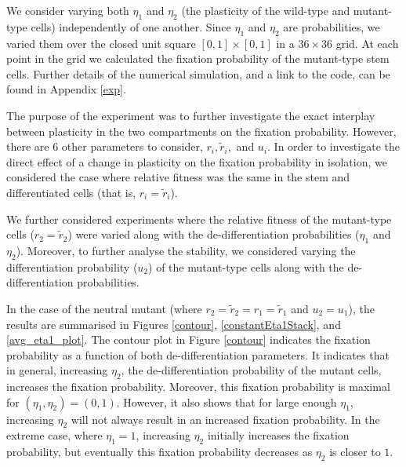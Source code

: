 \documentclass[12pt]{article}
\begin{document}
We consider varying both $\eta_1$ and $\eta_2$ (the plasticity of the wild-type and mutant-type cells) independently of one another. Since $\eta_1$ and $\eta_2$ are probabilities, we varied them over the closed unit square $[0,1]\times[0,1]$ in a $36\times36$ grid. At each point in the grid we calculated the fixation probability of the mutant-type stem cells. Further details of the numerical simulation, and a link to the code, can be found in Appendix \ref{exp}. 

The purpose of the experiment was to further investigate the exact interplay between plasticity in the two compartments on the fixation probability. However, there are 6 other parameters to consider,  $r_i, \tilde{r}_i,$ and $u_i$. In order to investigate the direct effect of a change in plasticity on the fixation probability in isolation, we considered the case where relative fitness was the same in the stem and differentiated cells (that is, $r_i=\tilde{r}_i$).

We further considered experiments where the relative fitness of the mutant-type cells ($r_2=\tilde{r}_2$) were varied along with the de-differentiation probabilities ($\eta_1$ and $\eta_2$). Moreover, to further analyse the stability, we considered varying the differentiation probability ($u_2$) of the mutant-type cells along with the de-differentiation probabilities.

In the case of the neutral mutant (where $r_2=\tilde{r}_2=r_1=\tilde{r}_1$ and $u_2=u_1$), the results are summarised in Figures \ref{contour}, \ref{constantEta1Stack}, and \ref{avg_eta1_plot}. The contour plot in Figure \ref{contour} indicates the fixation probability as a function of both de-differentiation parameters. It indicates that in general, increasing $\eta_2$, the de-differentiation probability of the mutant cells, increases the fixation probability. Moreover, this fixation probability is maximal for $(\eta_1, \eta_2) = (0, 1)$. However, it also shows that for large enough $\eta_1$, increasing $\eta_2$ will not always result in an increased fixation probability. In the extreme case, where $\eta_1=1$, increasing $\eta_2$ initially increases the fixation probability, but eventually this fixation probability decreases as $\eta_2$ is closer to $1$.
\end{document}
